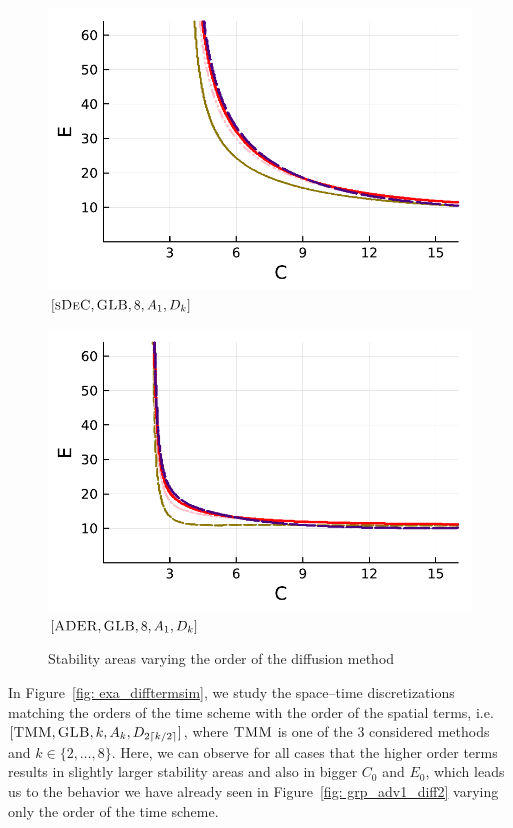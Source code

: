 \begin{figure}[!h]
\begin{minipage}[t]{0.32\textwidth}
		\includegraphics[width=\textwidth]{pdf/pdepics/diff/IMEXDeC_subtimesteps_gaussLobatto_diff_ord_2468.pdf}
		\centering
		$[\textsc{sDeC},\textsc{GLB}, 8, A_1,D_k]$
	\end{minipage}
	\begin{minipage}[t]{0.32\textwidth}
		\includegraphics[width=\textwidth]{pdf/pdepics/diff/IMEXADER_gaussLobatto_diff_ord_2468.pdf}
		\centering
		$[\textsc{ADER},\textsc{GLB}, 8, A_1,D_k]$
	\end{minipage}
	\caption{Stability areas varying the order of the diffusion method}
	\label{fig: exa_diffterm}
\end{figure}
In Figure~\ref{fig: exa_difftermsim}, we study the space--time discretizations matching the orders of the time scheme with the order of the spatial terms, i.e.  $[\textsc{TMM},\textsc{GLB}, k, A_k,D_{2\lceil k/2 \rceil}]$, where $\textsc{TMM}$ is one of the 3 considered methods and $k \in \{2, \hdots, 8\}$.
Here, we can observe for all cases that the higher order terms results in slightly larger stability areas and also in bigger $C_0$ and $E_0$, which leads us to the behavior we have already seen in Figure~\ref{fig: grp_adv1_diff2} varying only the order of the time scheme. 

